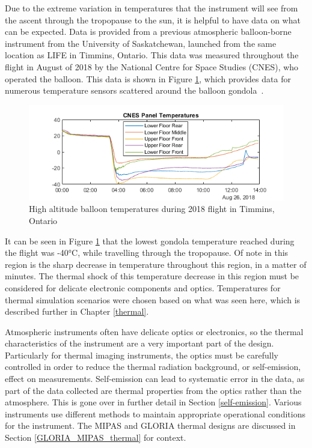 Due to the extreme variation in temperatures that the instrument will see from the ascent through the tropopause to the sun, it is helpful to have data on what can be expected. Data is provided from a previous atmospheric balloon-borne instrument from the University of Saskatchewan, launched from the same location as LIFE in Timmins, Ontario. This data was measured throughout the flight in August of 2018 by the National Centre for Space Studies (CNES), who operated the balloon. This data is shown in Figure \ref{fig:2018_timmins_temps}, which provides data for numerous temperature sensors scattered around the balloon gondola~\citep{CATS_report}.
 
 \begin{figure}[h]
\centering
  \includegraphics{chap2_images/CNES_temps_CATS_2018.png}
  \caption{High altitude balloon temperatures during 2018 flight in Timmins, Ontario}
  \label{fig:2018_timmins_temps}
\end{figure}

It can be seen in Figure \ref{fig:2018_timmins_temps} that the lowest gondola temperature reached during the flight was -40°C, while travelling through the tropopause. Of note in this region is the sharp decrease in temperature throughout this region, in a matter of minutes. The thermal shock of this temperature decrease in this region must be considered for delicate electronic components and optics. Temperatures for thermal simulation scenarios were chosen based on what was seen here, which is described further in Chapter \ref{thermal}.

Atmospheric instruments often have delicate optics or electronics, so the thermal characteristics of the instrument are a very important part of the design. Particularly for thermal imaging instruments, the optics must be carefully controlled in order to reduce the thermal radiation background, or self-emission, effect on measurements. Self-emission can lead to systematic error in the data, as part of the data collected are thermal properties from the optics rather than the atmosphere. This is gone over in further detail in Section \ref{self-emission}. Various instruments use different methods to maintain appropriate operational conditions for the instrument. The MIPAS and GLORIA thermal designs are discussed in Section \ref{GLORIA_MIPAS_thermal} for context. 

